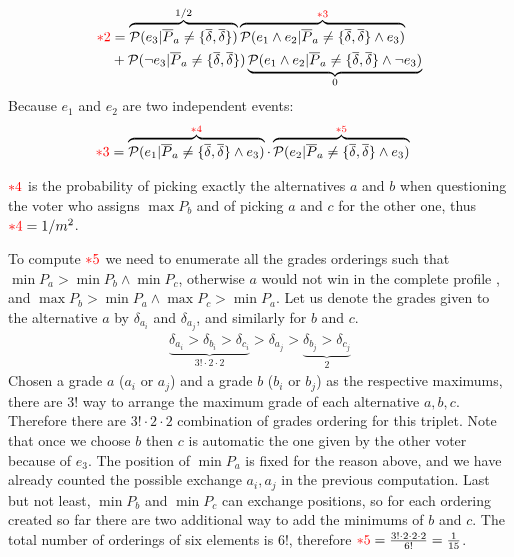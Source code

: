 \documentclass[version=3.21, pagesize, twoside=off, bibliography=totoc, DIV=calc, fontsize=12pt, a4paper]{scrartcl}
\begin{document}
\begin{align}
	{\color{red}*2} &=\overbrace{\mathcal{P}(e_3 |\overline{P}_a\neq\{\overline{\delta},\overline{\delta}\}) }^{1/2} \overbrace{\mathcal{P}(e_1 \wedge e_2|\overline{P}_a\neq\{\overline{\delta},\overline{\delta}\}\wedge e_3)}^{{\color{red}*3}}\\
	&+\mathcal{P}(\lnot e_3 |\overline{P}_a\neq\{\overline{\delta},\overline{\delta}\}) \underbrace{\mathcal{P}(e_1 \wedge e_2|\overline{P}_a\neq\{\overline{\delta},\overline{\delta}\}\wedge \lnot e_3)}_{0}
\end{align}
Because $e_1$ and $e_2$ are two independent events:
\begin{align}
	{\color{red}*3} &=\overbrace{\mathcal{P}(e_1 |\overline{P}_a\neq\{\overline{\delta},\overline{\delta}\}\wedge e_3)}^{{\color{red}*4}} \cdot \overbrace{\mathcal{P}(e_2 |\overline{P}_a\neq\{\overline{\delta},\overline{\delta}\}\wedge e_3)}^{{\color{red}*5}}
\end{align}

${\color{red}*4}$ is the probability of picking exactly the alternatives $a$ and $b$ when questioning the voter who assigns $\max{P_{b}}$ and of picking $a$ and $c$ for the other one, thus ${\color{red}*4}=1/m^2$. 

To compute ${\color{red}*5}$ we need to enumerate all the grades orderings such that $\min{P_{a}}>\min{P_{b}}\wedge \min{P_{c}}$, otherwise $a$ would not win in the complete profile , and $\max{P_{b}}>\min{P_{a}}\wedge \max{P_{c}}>\min{P_{a}}$. Let us denote the grades given to the alternative $a$ by $\delta_{a_i}$ and $\delta_{a_j}$, and similarly for $b$ and $c$.
\begin{align}
	\underbrace{\delta_{a_i}>\delta_{b_i}>\delta_{c_i}}_{3!\cdot 2\cdot 2}>\delta_{a_j}>\underbrace{\delta_{b_j}>\delta_{c_j}}_{2}
\end{align}
Chosen a grade $a$ ($a_i$ or $a_j$) and a grade $b$ ($b_i$ or $b_j$) as the respective maximums, there are $3!$ way to arrange the maximum grade of each alternative $a, b, c$. Therefore there are $3! \cdot 2 \cdot 2$ combination of grades ordering for this triplet. Note that once we choose $b$ then $c$ is automatic the one given by the other voter because of $e_3$. The position of $\min{P_{a}}$ is fixed for the reason above, and we have already counted the possible exchange $a_i, a_j$ in the previous computation. Last but not least, $\min{P_{b}}$ and $\min{P_{c}}$ can exchange positions, so for each ordering created so far there are two additional way to add the minimums of $b$ and $c$. The total number of orderings of six elements is $6!$, therefore ${\color{red}*5}= \frac{3!\cdot 2\cdot 2\cdot2}{6!}=\frac{1}{15}$.
\end{document}
